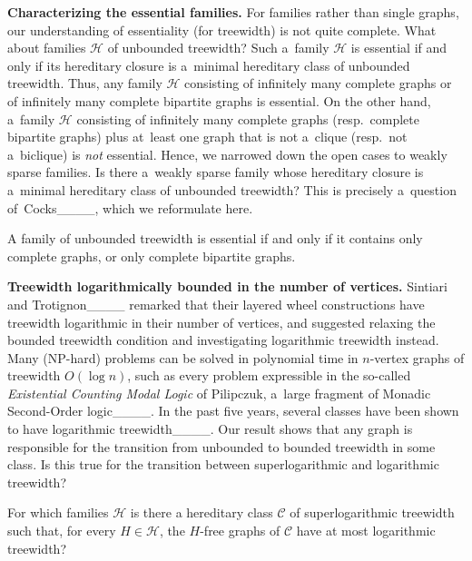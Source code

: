 \medskip

\textbf{Characterizing the essential families.}
For families rather than single graphs, our understanding of essentiality (for treewidth) is not quite complete.
What about families $\mathcal H$ of unbounded treewidth?
Such a~family $\mathcal H$ is essential if and only if its hereditary closure is a~minimal hereditary class of unbounded treewidth.
Thus, any family $\mathcal H$ consisting of infinitely many complete graphs or of infinitely many complete bipartite graphs is essential.
On the other hand, a~family $\mathcal H$ consisting of infinitely many complete graphs (resp.~complete bipartite graphs) plus at~least one graph that is not a~clique (resp.~not a~biclique) is \emph{not} essential.
Hence, we narrowed down the open cases to weakly sparse families.
Is there a~weakly sparse family whose hereditary closure is a~minimal hereditary class of unbounded treewidth?
This is precisely a~question of~Cocks____, which we reformulate here.

\begin{conjecture}
    A family of unbounded treewidth is essential if and only if it contains only complete graphs, or only complete bipartite graphs. 
\end{conjecture}

\medskip

\textbf{Treewidth logarithmically bounded in the number of vertices.}
Sintiari and Trotignon____ remarked that their layered wheel constructions have treewidth logarithmic in their number of vertices, and suggested relaxing the bounded treewidth condition and investigating logarithmic treewidth instead. 
Many (NP-hard) problems can be solved in polynomial time in $n$-vertex graphs of treewidth $O(\log n)$, such as every problem expressible in the so-called \emph{Existential Counting Modal Logic} of Pilipczuk, a~large fragment of Monadic Second-Order logic____.
In the past five years, several classes have been shown to have logarithmic treewidth____.
Our result shows that any graph is responsible for the transition from unbounded to bounded treewidth in some class.
Is this true for the transition between superlogarithmic and logarithmic treewidth? 

\begin{problem}\label{p:logarithmic-tw}
    For which families $\mathcal H$ is there a hereditary class $\mathcal C$ of superlogarithmic treewidth such that, for every $H \in \mathcal H$, the $H$-free graphs of $\mathcal C$ have at most logarithmic treewidth?
\end{problem}

